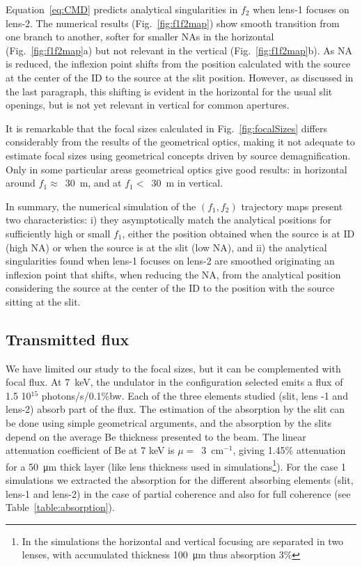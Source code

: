 \documentclass{iucr}              %
\begin{document}
Equation~\ref{eq:CMD} predicts analytical singularities in $f_2$ when lens-1 focuses on lens-2. The numerical results (Fig.~\ref{fig:f1f2map}) show smooth transition from one branch to another, softer for smaller NAs in the horizontal (Fig.~\ref{fig:f1f2map}a) but not relevant in the vertical (Fig.~\ref{fig:f1f2map}b). As NA is reduced, the inflexion point shifts from the position calculated with the source at the center of the ID to the source at the slit position. However, as discussed in the last paragraph, this shifting is evident in the horizontal for the usual slit openings, but is not yet relevant in vertical for common apertures. 

It is remarkable that the focal sizes calculated in Fig.~\ref{fig:focalSizes} differs considerably from the results of the geometrical optics, making it not adequate to estimate focal sizes using geometrical concepts driven by source demagnification. Only in some particular areas geometrical optics give good results: in horizontal around $f_1\approx$~\SI{30}{\meter}, and at  $f_1 <$~\SI{30}{\meter} in vertical. 

In summary, the numerical simulation of the $(f_1,f_2)$ trajectory maps present two characteristics: i) they asymptotically match the analytical positions for sufficiently high or small $f_1$, either the position obtained when the source is at ID (high NA) or when the source is at the slit (low NA), and ii) the analytical singularities found when lens-1 focuses on lens-2 are smoothed originating an inflexion point that shifts, when reducing the NA, from the analytical position considering the source at the center of the ID to the position with the source sitting at the slit.   

\subsection{Transmitted flux} We have limited our study to the focal sizes, but it can be complemented with focal flux. At \SI{7}{keV}, the undulator in the configuration selected emits a flux of 1.5 10$^{15}$ photons/s/0.1\%bw. Each of the three elements studied (slit, lens -1 and lens-2) absorb part of the flux. The estimation of the absorption by the slit can be done using simple geometrical arguments, and the absorption by the slits depend on the average Be thickness presented to the beam. The linear attenuation coefficient of Be at 7 keV is $\mu=$~\SI{3}{\centi\meter}$^{-1}$, giving 1.45\% attenuation for a \SI{50}{\micro\meter} thick layer (like lens thickness used in simulations\footnote{In the simulations the horizontal and vertical focusing are separated in two lenses, with accumulated thickness \SI{100}{\micro\meter} thus absorption 3\%}). For the case 1 simulations we extracted the absorption for the different absorbing elements (slit, lens-1 and lens-2) in the case of partial coherence and also for full coherence (see Table~\ref{table:absorption}).
\end{document}
